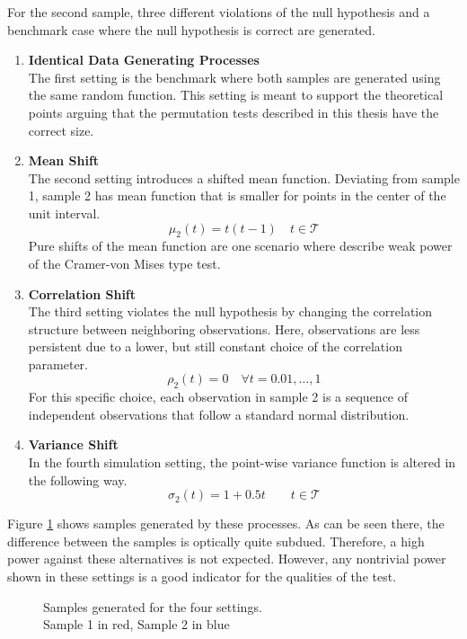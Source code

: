 \documentclass[12pt, a4paper]{article}
\theoremstyle{MAstyle} \newtheorem{assumption}{Assumption}[section]
\theoremstyle{MAstyle} \newtheorem{definition}{Definition}[section]
\theoremstyle{MAstyle} \newtheorem{theorem}{Theorem}[section]
\begin{document}
		For the second sample, three different violations of the null hypothesis and a benchmark case where the null hypothesis is correct are generated.
		\begin{enumerate}
			\item \textbf{Identical Data Generating Processes}\\
				  The first setting is the benchmark where both samples are generated using the same random function. This setting is meant to support the theoretical points arguing that the permutation tests described in this thesis have the correct size.
			\item \textbf{Mean Shift}\\
				  The second setting introduces a shifted mean function. Deviating from sample 1, sample 2 has mean function that is smaller for points in the center of the unit interval.
				  $$\mu_2(t) = t (t-1) \quad t \in \mathcal{T}$$
				  Pure shifts of the mean function are one scenario where \cite{bugni_permutation_2021} describe weak power of the Cramer-von Mises type test. 
			\item \textbf{Correlation Shift}\\
			 	  The third setting violates the null hypothesis by changing the correlation structure between neighboring observations. Here, observations are less persistent due to a lower, but still constant choice of the correlation parameter.
			 	  $$\rho_2(t) = 0 \quad \forall t = 0.01, \dots, 1$$
			 	  For this specific choice, each observation in sample 2 is a sequence of independent observations that follow a standard normal distribution.
			\item \textbf{Variance Shift}\\
				  In the fourth simulation setting, the point-wise variance function is altered in the following way.
				  $$\sigma_2(t) = 1 + 0.5t \quad \quad t \in \mathcal{T}$$
		\end{enumerate}
	
		Figure \ref{settings} shows samples generated by these processes. As can be seen there, the difference between the samples is optically quite subdued. Therefore, a high power against these alternatives is not expected. However, any nontrivial power shown in these settings is a good indicator for the qualities of the test.
		\begin{figure}[H]
			\caption{Samples generated for the four settings. \\
			Sample 1 in red, Sample 2 in blue}
			\label{settings}
		\end{figure}
		
\end{document}
